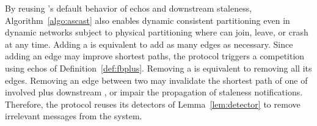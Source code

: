 By reusing \NAME's default behavior of echos and downstream staleness,
Algorithm~\ref{algo:ascast} also enables dynamic consistent partitioning
even in dynamic networks subject to physical partitioning where
\processes can join, leave, or crash at any time. Adding a \process is
equivalent to add as many edges as necessary. Since adding an edge may
improve shortest paths, the protocol triggers a competition using
echos of Definition~\ref{def:fbplus}.  Removing a \process is
equivalent to removing all its edges. Removing an edge between two
\processes may invalidate the shortest path of one of involved
\processes plus downstream \processes, or impair the propagation of
staleness notifications. Therefore, the protocol reuses its detectors
of Lemma~\ref{lem:detector} to remove irrelevant messages from the
system.








